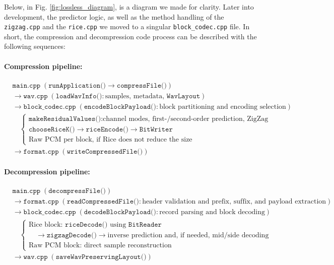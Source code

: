 Below, in Fig. \ref{fig:lossless_diagram}, is a diagram we made for clarity. Later into development, the predictor logic, as well as the method handling of the \texttt{zigzag.cpp} and the \texttt{rice.cpp} we moved to a singular \texttt{block\_codec.cpp} file. In short, the compression and decompression code process can be described with the following sequences:

\paragraph{Compression pipeline:}
\[
\begin{aligned}
&\texttt{main.cpp} \; (\texttt{runApplication()} \to \texttt{compressFile()})\\
&\to \texttt{wav.cpp} \; (\texttt{loadWavInfo()}: \text{samples, metadata, } \texttt{WavLayout})\\
&\to \texttt{block\_codec.cpp} \; (\texttt{encodeBlockPayload()}: \text{block partitioning and encoding selection})\\
&\quad \begin{cases}
\texttt{makeResidualValues()}: \text{channel modes, first-/second-order prediction, ZigZag}\\
\texttt{chooseRiceK()} \to \texttt{riceEncode()} \to \texttt{BitWriter}\\
\text{Raw PCM per block, if Rice does not reduce the size}
\end{cases}\\
&\to \texttt{format.cpp} \; (\texttt{writeCompressedFile()})
\end{aligned}
\]

\paragraph{Decompression pipeline:}
\[
\begin{aligned}
&\texttt{main.cpp} \; (\texttt{decompressFile()})\\
&\to \texttt{format.cpp} \; (\texttt{readCompressedFile()}: \text{header validation and prefix, suffix, and payload extraction})\\
&\to \texttt{block\_codec.cpp} \; (\texttt{decodeBlockPayload()}: \text{record parsing and block decoding})\\
&\quad \begin{cases}
\text{Rice block: } \texttt{riceDecode()} \text{ using } \texttt{BitReader}\\
\quad \to \texttt{zigzagDecode()} \to \text{inverse prediction and, if needed, mid/side decoding}\\
\text{Raw PCM block: direct sample reconstruction}
\end{cases}\\
&\to \texttt{wav.cpp} \; (\texttt{saveWavPreservingLayout()})
\end{aligned}
\]

